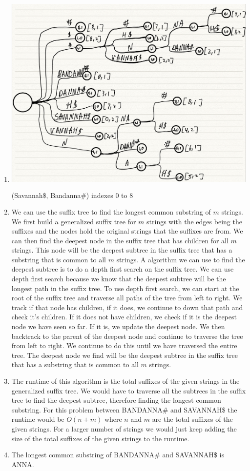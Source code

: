 \documentclass[12pt,letterpaper]{article}
\begin{document}
\begin{enumerate}
    \item \includegraphics[scale=.2]{./images/Suffixtree-1.png}
    
    (Savannah\$, Bandanna\#) indexes 0 to 8
    \item We can use the suffix tree to find the longest common substring of $m$ strings. 
    We first build a generalized suffix tree for $m$ strings with the edges being the suffixes and the nodes hold the original strings that the suffixes are from.
    We can then find the deepest node in the suffix tree that has children for all $m$ strings. 
    This node will be the deepest subtree in the suffix tree that has a substring that is common to all $m$ strings.
    A algorithm we can use to find the deepest subtree is to do a depth first search on the suffix tree.
    We can use depth first search because we know that the deepest subtree will be the longest path in the suffix tree.
    To use depth first search, we can start at the root of the suffix tree and traverse all paths of the tree 
    from left to right. We track if that node has children, if it does, we continue to down that path and check it's children.
    If it does not have children, we check if it is the deepest node we have seen so far. If it is, we update the deepest node.
    We then backtrack to the parent of the deepest node and continue to traverse the tree from left to right. 
    We continue to do this until we have traversed the entire tree.
    The deepest node we find will be the deepest subtree in the suffix tree that has a substring that is common to all $m$ strings.
    \item The runtime of this algorithm is the total suffixes of the given strings in the generalized suffix tree.
    We would have to traverse all the subtrees in the suffix tree to find the deepest subtree, therefore finding the longest common substring.
    For this problem between BANDANNA\# and SAVANNAH\$ the runtime would be $O(n + m)$ where $n$ and $m$ are the total suffixes of the given strings. 
    For a larger number of strings we would just keep adding the size of the total suffixes of the given strings to the runtime.
    \item The longest common substring of BANDANNA\# and SAVANNAH\$ is ANNA.
    

\end{enumerate}
\end{document}
